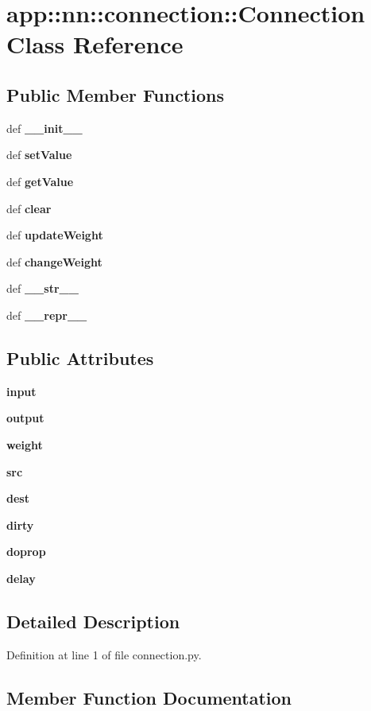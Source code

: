 \section{app::nn::connection::Connection Class Reference}
\label{classapp_1_1nn_1_1connection_1_1Connection}
\subsection*{Public Member Functions}
\begin{CompactItemize}
\item 
def {\bf \_\-\_\-init\_\-\_\-}
\item 
def {\bf setValue}
\item 
def {\bf getValue}
\item 
def {\bf clear}
\item 
def {\bf updateWeight}
\item 
def {\bf changeWeight}
\item 
def {\bf \_\-\_\-str\_\-\_\-}
\item 
def {\bf \_\-\_\-repr\_\-\_\-}
\end{CompactItemize}
\subsection*{Public Attributes}
\begin{CompactItemize}
\item 
{\bf input}
\item 
{\bf output}
\item 
{\bf weight}
\item 
{\bf src}
\item 
{\bf dest}
\item 
{\bf dirty}
\item 
{\bf doprop}
\item 
{\bf delay}
\end{CompactItemize}


\subsection{Detailed Description}


Definition at line 1 of file connection.py.

\subsection{Member Function Documentation}
